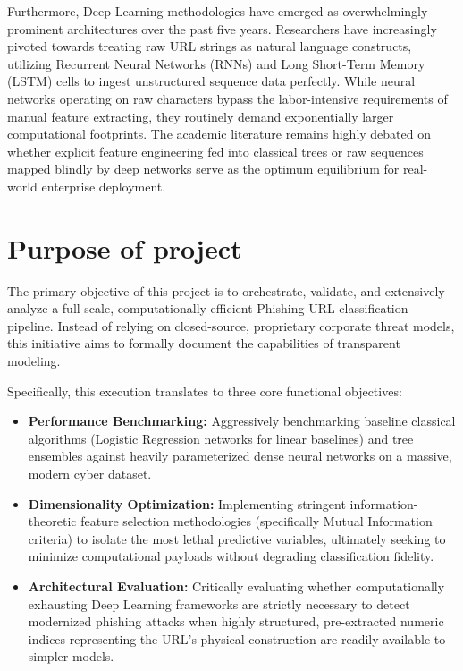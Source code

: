 \documentclass[12pt,a4paper]{article}
\begin{document}
Furthermore, Deep Learning methodologies have emerged as overwhelmingly prominent architectures over the past five years. Researchers have increasingly pivoted towards treating raw URL strings as natural language constructs, utilizing Recurrent Neural Networks (RNNs) and Long Short-Term Memory (LSTM) cells to ingest unstructured sequence data perfectly. While neural networks operating on raw characters bypass the labor-intensive requirements of manual feature extracting, they routinely demand exponentially larger computational footprints. The academic literature remains highly debated on whether explicit feature engineering fed into classical trees or raw sequences mapped blindly by deep networks serve as the optimum equilibrium for real-world enterprise deployment.

\section{Purpose of project}
The primary objective of this project is to orchestrate, validate, and extensively analyze a full-scale, computationally efficient Phishing URL classification pipeline. Instead of relying on closed-source, proprietary corporate threat models, this initiative aims to formally document the capabilities of transparent modeling. 

Specifically, this execution translates to three core functional objectives:
\begin{itemize}
    \item \textbf{Performance Benchmarking:} Aggressively benchmarking baseline classical algorithms (Logistic Regression networks for linear baselines) and tree ensembles against heavily parameterized dense neural networks on a massive, modern cyber dataset.
    \item \textbf{Dimensionality Optimization:} Implementing stringent information-theoretic feature selection methodologies (specifically Mutual Information criteria) to isolate the most lethal predictive variables, ultimately seeking to minimize computational payloads without degrading classification fidelity.
    \item \textbf{Architectural Evaluation:} Critically evaluating whether computationally exhausting Deep Learning frameworks are strictly necessary to detect modernized phishing attacks when highly structured, pre-extracted numeric indices representing the URL's physical construction are readily available to simpler models.
\end{itemize}
\end{document}
